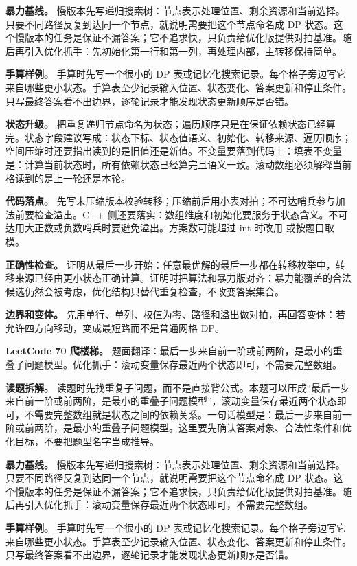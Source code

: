 \textbf{暴力基线。} 慢版本先写递归搜索树：节点表示处理位置、剩余资源和当前选择。只要不同路径反复到达同一个节点，就说明需要把这个节点命名成 DP 状态。这个慢版本的任务是保证不漏答案；它不追求快，只负责给优化版提供对拍基准。随后再引入优化抓手：先初始化第一行和第一列，再处理内部，主转移保持简单。

\textbf{手算样例。} 手算时先写一个很小的 DP 表或记忆化搜索记录。每个格子旁边写它来自哪些更小状态。手算表至少记录输入位置、状态变化、答案更新和停止条件。只写最终答案看不出边界，逐轮记录才能发现状态更新顺序是否错。

\textbf{状态升级。} 把重复递归节点命名为状态；遍历顺序只是在保证依赖状态已经算完。状态字段建议写成：状态下标、状态值语义、初始化、转移来源、遍历顺序；空间压缩时还要指出读到的是旧值还是新值。不变量要落到代码上：填表不变量是：计算当前状态时，所有依赖状态已经算完且语义一致。滚动数组必须解释当前格读到的是上一轮还是本轮。

\textbf{代码落点。} 先写未压缩版本校验转移；压缩前后用小表对拍；不可达哨兵参与加法前要检查溢出。C++ 侧还要落实：数组维度和初始化要服务于状态含义。不可达用大正数或负数哨兵时要避免溢出。方案数可能超过 int 时改用  或按题目取模。

\textbf{正确性检查。} 证明从最后一步开始：任意最优解的最后一步都在转移枚举中，转移来源已经由更小状态正确计算。证明时把算法和暴力版对齐：暴力能覆盖的合法候选仍然会被考虑，优化结构只替代重复检查，不改变答案集合。

\textbf{边界和变体。} 先用单行、单列、权值为零、路径和溢出做对拍，再回答变体：若允许四方向移动，变成最短路而不是普通网格 DP。

\noindent\textbf{LeetCode 70 爬楼梯。} 题面翻译：最后一步来自前一阶或前两阶，是最小的重叠子问题模型。优化抓手：滚动变量保存最近两个状态即可，不需要完整数组。

\textbf{读题拆解。} 读题时先找重复子问题，而不是直接背公式。本题可以压成“最后一步来自前一阶或前两阶，是最小的重叠子问题模型”，滚动变量保存最近两个状态即可，不需要完整数组就是状态之间的依赖关系。一句话模型是：最后一步来自前一阶或前两阶，是最小的重叠子问题模型。这里要先确认答案对象、合法性条件和优化目标，不要把题型名字当成推导。

\textbf{暴力基线。} 慢版本先写递归搜索树：节点表示处理位置、剩余资源和当前选择。只要不同路径反复到达同一个节点，就说明需要把这个节点命名成 DP 状态。这个慢版本的任务是保证不漏答案；它不追求快，只负责给优化版提供对拍基准。随后再引入优化抓手：滚动变量保存最近两个状态即可，不需要完整数组。

\textbf{手算样例。} 手算时先写一个很小的 DP 表或记忆化搜索记录。每个格子旁边写它来自哪些更小状态。手算表至少记录输入位置、状态变化、答案更新和停止条件。只写最终答案看不出边界，逐轮记录才能发现状态更新顺序是否错。

